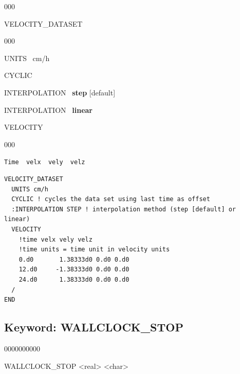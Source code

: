 \begin{deflist}{000}
\item[VELOCITY\_DATASET] ~
\begin{deflist}{000}
\item[UNITS] \ cm/h
\item[CYCLIC]
\item[INTERPOLATION] \ {\bf step} [default]
\item[INTERPOLATION] \ {\bf linear}
\item[VELOCITY] ~
\begin{deflist}{000}
\item[{\tt Time \ velx \ vely \ velz}]
\end{deflist}
\item[\keyend]
\end{deflist}
\item[\keyend]
\end{deflist}


\begin{mdframed}

\footnotesize
\begin{verbatim}
VELOCITY_DATASET
  UNITS cm/h
  CYCLIC ! cycles the data set using last time as offset
  :INTERPOLATION STEP ! interpolation method (step [default] or linear)
  VELOCITY
    !time velx vely velz
    !time units = time unit in velocity units
    0.d0       1.38333d0 0.d0 0.d0 
    12.d0     -1.38333d0 0.d0 0.d0 
    24.d0      1.38333d0 0.d0 0.d0 
  /
END
\end{verbatim}
\normalsize
\end{mdframed}

\hyperlink{target_key}{\return}


\newpage
\protect\hypertarget{target_wallclk}{}

\subsection{Keyword: WALLCLOCK\_STOP}

\hfill\hyperlink{target_key}{\return}

\begin{deflist}{0000000000}
\item[WALLCLOCK\_STOP] <real> <char>
\end{deflist}

